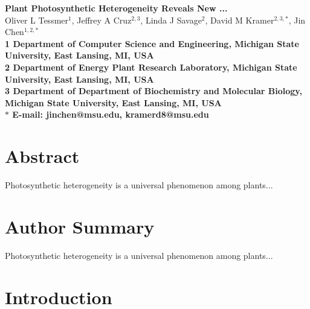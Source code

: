 \pagestyle{myheadings}







\begin{flushleft}
{\Large
\textbf{Plant Photosynthetic Heterogeneity Reveals New ...}
}
\\
Oliver L Tessmer$^{1}$,
Jeffrey A Cruz$^{2,3}$,
Linda J Savage$^{2}$,
David M Kramer$^{2,3,\ast}$,
Jin Chen$^{1,2,\ast}$
\\
\bf{1} Department of Computer Science and Engineering, Michigan State University, East Lansing, MI, USA
\\
\bf{2} Department of Energy Plant Research Laboratory, Michigan State University, East Lansing, MI, USA
\\
\bf{3} Department of Department of Biochemistry and Molecular Biology, Michigan State University, East Lansing, MI, USA
\\
$\ast$ E-mail: jinchen@msu.edu, kramerd8@msu.edu
\end{flushleft}

\section*{Abstract}

Photosynthetic heterogeneity is a universal phenomenon among plants...

\section*{Author Summary}

Photosynthetic heterogeneity is a universal phenomenon among plants...

\section*{Introduction}


